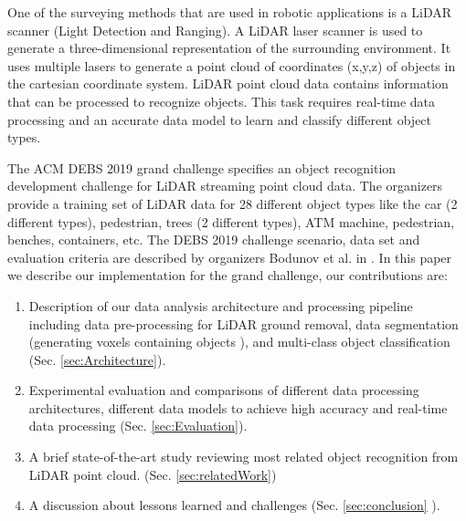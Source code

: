 \documentclass[sigconf]{acmart}
\begin{document}
One of the surveying methods that are used in robotic applications is a LiDAR scanner (Light
Detection and Ranging). A LiDAR laser scanner is used to generate a three-dimensional representation of the surrounding environment. It uses multiple lasers to generate a point cloud of coordinates (x,y,z) of objects in the cartesian coordinate system. LiDAR point cloud data contains information that can be processed to recognize objects. This task requires real-time data processing and an accurate data model to learn and classify different object types.

The ACM DEBS 2019 grand challenge \cite{DEBSGC2019} specifies an object recognition development challenge for LiDAR streaming point cloud data.
The organizers provide a training set of LiDAR data for 28 different object types like the car (2 different types), pedestrian, trees (2 different types),
 ATM machine, pedestrian, benches, containers, etc. The DEBS 2019 challenge scenario, data set and evaluation criteria are described by organizers Bodunov et al. in \cite{DEBSGC2019}.
In this paper we describe our implementation for the grand challenge, our contributions are:


\begin{enumerate}

  \item Description of our data analysis architecture and processing pipeline including data pre-processing for LiDAR ground removal,
  data segmentation (generating voxels containing objects ), and multi-class object classification  (Sec.  \ref{sec:Architecture}).
  \item Experimental evaluation and comparisons of different data processing architectures, different data models to achieve high
  accuracy and real-time data processing (Sec. \ref{sec:Evaluation}).
  \item A brief state-of-the-art study reviewing most related object recognition from LiDAR point cloud.  (Sec. \ref{sec:relatedWork})
  \item A discussion about lessons learned and challenges (Sec. \ref{sec:conclusion} ).
\end{enumerate}




























\end{document}
